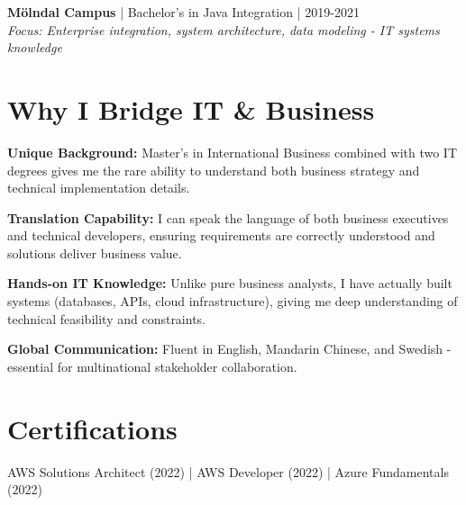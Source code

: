 \documentclass[10pt,a4paper]{article}
\begin{document}
\textbf{Mölndal Campus} | Bachelor's in Java Integration | 2019-2021\\
\textit{Focus: Enterprise integration, system architecture, data modeling - IT systems knowledge}

\section*{Why I Bridge IT \& Business}

\textbf{Unique Background:} Master's in International Business combined with two IT degrees gives me the rare ability to understand both business strategy and technical implementation details.

\textbf{Translation Capability:} I can speak the language of both business executives and technical developers, ensuring requirements are correctly understood and solutions deliver business value.

\textbf{Hands-on IT Knowledge:} Unlike pure business analysts, I have actually built systems (databases, APIs, cloud infrastructure), giving me deep understanding of technical feasibility and constraints.

\textbf{Global Communication:} Fluent in English, Mandarin Chinese, and Swedish - essential for multinational stakeholder collaboration.

\section*{Certifications}
AWS Solutions Architect (2022) | AWS Developer (2022) | Azure Fundamentals (2022)
\end{document}
